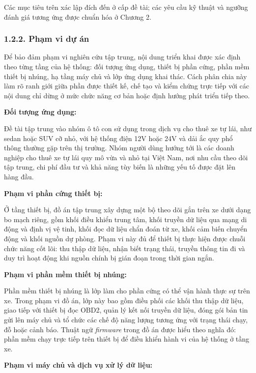 \documentclass[a4paper]{extarticle}
\begin{document}
Các mục tiêu trên xác lập đích đến ở cấp đề tài; các yêu cầu kỹ thuật
và ngưỡng đánh giá tương ứng được chuẩn hóa ở Chương 2.

\subsubsection{1.2.2. Phạm vi dự án}\label{phux1ea1m-vi-dux1ef1-uxe1n}

Để bảo đảm phạm vi nghiên cứu tập trung, nội dung triển khai được xác
định theo từng tầng của hệ thống: đối tượng ứng dụng, thiết bị phần
cứng, phần mềm thiết bị nhúng, hạ tầng máy chủ và lớp ứng dụng khai
thác. Cách phân chia này làm rõ ranh giới giữa phần được thiết kế, chế
tạo và kiểm chứng trực tiếp với các nội dung chỉ dừng ở mức chức năng cơ
bản hoặc định hướng phát triển tiếp theo.

\textbf{Đối tượng ứng dụng:}

Đề tài tập trung vào nhóm ô tô con sử dụng trong dịch vụ cho thuê xe tự
lái, như sedan hoặc SUV cỡ nhỏ, với hệ thống điện 12V hoặc 24V và dải
ắc quy phổ thông thường gặp trên thị trường. Nhóm người dùng hướng tới
là các doanh nghiệp cho thuê xe tự lái quy mô vừa và nhỏ tại Việt Nam,
nơi nhu cầu theo dõi tập trung, chi phí đầu tư và khả năng tùy biến là
những yếu tố được đặt lên hàng đầu.

\textbf{Phạm vi phần cứng thiết bị:}

Ở tầng thiết bị, đồ án tập trung xây dựng một bộ theo dõi gắn trên xe
dưới dạng bo mạch riêng, gồm khối điều khiển trung tâm, khối truyền dữ
liệu qua mạng di động và định vị vệ tinh, khối đọc dữ liệu chẩn đoán từ
xe, khối cảm biến chuyển động và khối nguồn dự phòng. Phạm vi này đủ để
thiết bị thực hiện được chuỗi chức năng cốt lõi: thu thập dữ liệu, nhận
biết trạng thái, truyền thông tin đi và duy trì hoạt động khi nguồn
chính bị gián đoạn trong thời gian ngắn.

\textbf{Phạm vi phần mềm thiết bị nhúng:}

Phần mềm thiết bị nhúng là lớp làm cho phần cứng có thể vận hành thực sự
trên xe. Trong phạm vi đồ án, lớp này bao gồm điều phối các khối thu thập
dữ liệu, giao tiếp với thiết bị đọc OBD2, quản lý kết nối truyền dữ liệu,
đóng gói bản tin gửi lên máy chủ và tổ chức các chế độ năng lượng tương
ứng với trạng thái chạy, đỗ hoặc cảnh báo. Thuật ngữ \emph{firmware} trong đồ
án được hiểu theo nghĩa đó: phần mềm chạy trực tiếp trên thiết bị để điều
khiển hành vi của hệ thống ở tầng xe.

\textbf{Phạm vi máy chủ và dịch vụ xử lý dữ liệu:}
\end{document}
